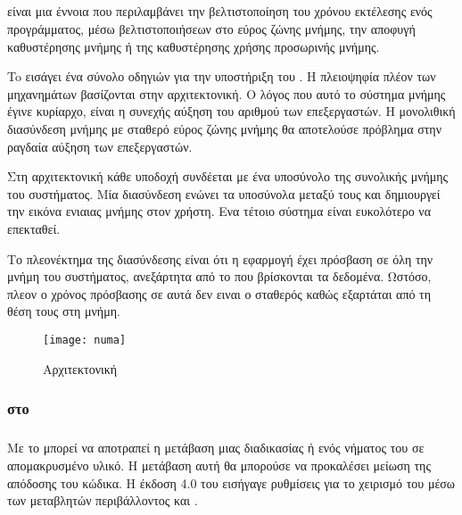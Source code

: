 \subsection{}
\subparagraph{}
\emph{} είναι μια έννοια που περιλαμβάνει την βελτιστοποίηση του χρόνου εκτέλεσης ενός προγράμματος, μέσω βελτιστοποιήσεων στο εύρος ζώνης μνήμης, την αποφυγή καθυστέρησης μνήμης ή της  καθυστέρησης χρήσης προσωρινής μνήμης.

To \emph{} εισάγει ένα σύνολο οδηγιών για την υποστήριξη του \emph{}\cite{thread_affinity}. Η πλειοψηφία πλέον των μηχανημάτων βασίζονται στην \emph{} αρχιτεκτονική. Ο λόγος που αυτό το σύστημα μνήμης έγινε κυρίαρχο, είναι η συνεχής αύξηση του αριθμού των επεξεργαστών. Η μονολιθική διασύνδεση μνήμης με σταθερό εύρος ζώνης μνήμης θα αποτελούσε πρόβλημα στην ραγδαία αύξηση των επεξεργαστών.

Στη \emph{} αρχιτεκτονική κάθε υποδοχή συνδέεται με ένα υποσύνολο της συνολικής μνήμης του συστήματος. Μία διασύνδεση ενώνει τα υποσύνολα μεταξύ τους και δημιουργεί την εικόνα ενιαιας μνήμης στον χρήστη. Ενα τέτοιο σύστημα είναι ευκολότερο να επεκταθεί.

Το πλεονέκτημα της διασύνδεσης είναι ότι η εφαρμογή έχει πρόσβαση σε όλη την μνήμη του συστήματος, ανεξάρτητα από το που βρίσκονται τα δεδομένα. Ωστόσο, πλεον ο χρόνος πρόσβασης σε αυτά δεν ειναι ο σταθερός καθώς εξαρτάται από τη θέση τους στη μνήμη.


\begin{figure}[h]
\texttt{[image: numa]}
\centering
\captionsetup{justification=centering, singlelinecheck=false}
	\caption{Αρχιτεκτονική \cite{thenextstep152}}
\label{fig:numa}
\end{figure}

\clearpage{}
\subsubsection{\emph{} στο \emph{}}
\subparagraph{}
Με το \emph{} μπορεί να αποτραπεί η μετάβαση μιας διαδικασίας \emph{} ή ενός νήματος του \emph{} σε απομακρυσμένο υλικό.
Η μετάβαση αυτή θα μπορούσε να προκαλέσει μείωση της απόδοσης του κώδικα. Η έκδοση 4.0 του \emph{} εισήγαγε ρυθμίσεις για το χειρισμό του \emph{} μέσω των μεταβλητών περιβάλλοντος  \emph{} και \emph{}\cite{affinity1}.
\ \\
\ \\
